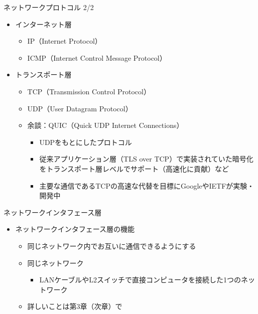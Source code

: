 \documentclass[12pt,aspectratio=169]{beamer}
\begin{document}
\begin{frame}{ネットワークプロトコル 2/2}

  \begin{itemize}
    \item インターネット層
      \begin{itemize}
        \item IP（Internet Protocol）
        \item ICMP（Internet Control Message Protocol）
      \end{itemize}

    \item トランスポート層
      \begin{itemize}
        \item TCP（Transmission Control Protocol）
        \item UDP（User Datagram Protocol）
        \item 余談：QUIC（Quick UDP Internet Connections）
          \begin{itemize}
            \item UDPをもとにしたプロトコル
            \item 従来アプリケーション層（TLS over TCP）で実装されていた暗号化をトランスポート層レベルでサポート（高速化に貢献）など
            \item 主要な通信であるTCPの高速な代替を目標にGoogleやIETFが実験・開発中
          \end{itemize}
      \end{itemize}

  \end{itemize}

\end{frame}


\begin{frame}{ネットワークインタフェース層}

  \begin{itemize}
    \item ネットワークインタフェース層の機能
      \begin{itemize}
        \item 同じネットワーク内でお互いに通信できるようにする
        \item 同じネットワーク
          \begin{itemize}
            \item LANケーブルやL2スイッチで直接コンピュータを接続した1つのネットワーク
          \end{itemize}
        \item 詳しいことは第3章（次章）で

      \end{itemize}

  \end{itemize}

\end{frame}
\end{document}
